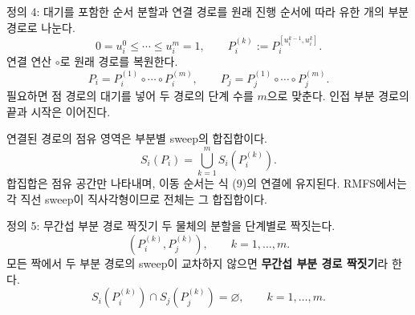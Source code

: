 \begin{frame}{정의 4: 대기를 포함한 순서 분할과 연결}
경로를 원래 진행 순서에 따라 유한 개의 부분 경로로 나눈다.
\begin{equation}
0=u_i^0\le\cdots\le u_i^m=1,\qquad P_i^{(k)}:=P_i^{[u_i^{k-1},u_i^k]}.
\tag{8}
\end{equation}
연결 연산 $\circ$로 원래 경로를 복원한다.
\begin{equation}
P_i=P_i^{(1)}\circ\cdots\circ P_i^{(m)},\qquad
P_j=P_j^{(1)}\circ\cdots\circ P_j^{(m)}.
\tag{9}
\end{equation}
\small 필요하면 점 경로의 대기를 넣어 두 경로의 단계 수를 $m$으로 맞춘다. 인접 부분 경로의 끝과 시작은 이어진다.
\medskip\par
\normalsize 연결된 경로의 점유 영역은 부분별 sweep의 합집합이다.
\begin{equation}S_i(P_i)=\bigcup_{k=1}^{m}S_i(P_i^{(k)}).\tag{10}\end{equation}
\small 합집합은 점유 공간만 나타내며, 이동 순서는 식 (9)의 연결에 유지된다. RMFS에서는 각 직선 sweep이 직사각형이므로 전체는 그 합집합이다.
\end{frame}

\begin{frame}{정의 5: 무간섭 부분 경로 짝짓기}
두 물체의 분할을 단계별로 짝짓는다.
\begin{equation}
\left(P_i^{(k)},P_j^{(k)}\right),\qquad k=1,\ldots,m.
\tag{11}
\end{equation}
모든 짝에서 두 부분 경로의 sweep이 교차하지 않으면 \textbf{무간섭 부분 경로 짝짓기}라 한다.
\begin{equation}
S_i(P_i^{(k)})\cap S_j(P_j^{(k)})=\varnothing,\qquad k=1,\ldots,m.
\tag{12}
\end{equation}
\end{frame}

